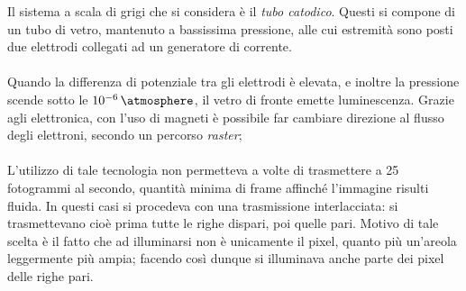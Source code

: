 \documentclass{subfiles}
\begin{document}
Il sistema a scala di grigi che si considera è il \emph{tubo catodico}.
Questi si compone di un tubo di vetro, mantenuto a bassissima pressione, alle cui estremità sono posti due elettrodi collegati ad un generatore di corrente.
\\ \\
Quando la differenza di potenziale tra gli elettrodi è elevata, e inoltre la pressione scende sotto le \(\SI{e-6}{\atmosphere}\), il vetro di fronte emette luminescenza.
Grazie agli elettronica, con l'uso di magneti è possibile far cambiare direzione al flusso degli elettroni, secondo un percorso \emph{raster\footnotemark[2]};
\\ \\
L'utilizzo di tale tecnologia non permetteva a volte di trasmettere a 25 fotogrammi al secondo, quantità minima di frame affinché l'immagine risulti fluida.
In questi casi si procedeva con una trasmissione interlacciata: si trasmettevano cioè prima tutte le righe dispari, poi quelle pari.
Motivo di tale scelta è il fatto che ad illuminarsi non è unicamente il pixel, quanto più un'areola leggermente più ampia;
facendo così dunque si illuminava anche parte dei pixel delle righe pari.

\end{document}
